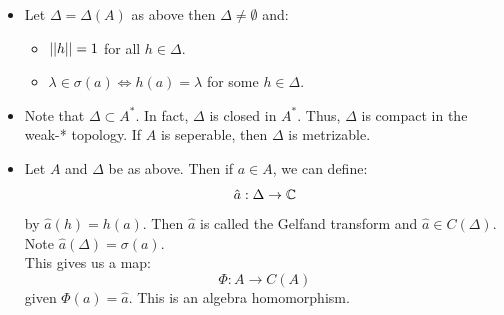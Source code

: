 \documentclass[12pt]{article}
\begin{document}
\begin{itemize}
    \[ h: A \to \C\]
    \item[Thm.] Let $\Delta = \Delta(A)$ as above then $\Delta \neq \emptyset$ and: 
    \begin{itemize}
        \item $\left\vert\left\vert h\right\vert\right\vert = 1$ for all $h \in \Delta$.
        \item $\lambda \in \sigma(a) \iff h(a) = \lambda$ for some $h \in \Delta$.
    \end{itemize}
    \item[Rmk.] Note that $\Delta \subset A^*$. In fact, $\Delta$ is closed in $A^*$. Thus, $\Delta$ is compact in the weak-* topology. If $A$ is seperable, then $\Delta$ is metrizable. 
    \item[Rmk.] Let $A$ and $\Delta$ be as above. Then if $a \in A$, we can define: 
    \[ \hat a: \Delta \to \mathbb C\]
    by $\hat a(h) = h(a)$. Then $\hat a$ is called the Gelfand transform and $\hat a \in C(\Delta)$. Note $\hat a(\Delta) = \sigma(a)$.\\
    This gives us a map: 
    \[ \Phi: A \to C(A)\]
    given $\Phi(a) = \hat a$. This is an algebra homomorphism.  
\end{itemize}
\end{document}

